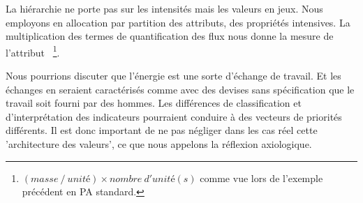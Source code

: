 La hiérarchie ne porte pas sur les intensités mais les valeurs en jeux.
Nous employons en allocation par partition des attributs, des propriétés intensives.
La multiplication des termes de quantification des flux nous donne la mesure de l'attribut~\cite{majeau-bettez_unified_2014}
\footnote{$(\mathit{masse}~/~\mathit{unité})\times\mathit{nombre~d'unité(s)}$ comme vue lors de l'exemple précédent en PA standard.}.

Nous pourrions discuter que l'énergie est une sorte d'échange de travail.
Et les échanges en seraient caractérisés comme avec des devises sans spécification que le travail soit fourni par des hommes.
Les différences de classification et d'interprétation des indicateurs pourraient conduire à des vecteurs de priorités différents.
Il est donc important de ne pas négliger dans les cas réel cette 'architecture des valeurs', ce que nous appelons la réflexion axiologique.

